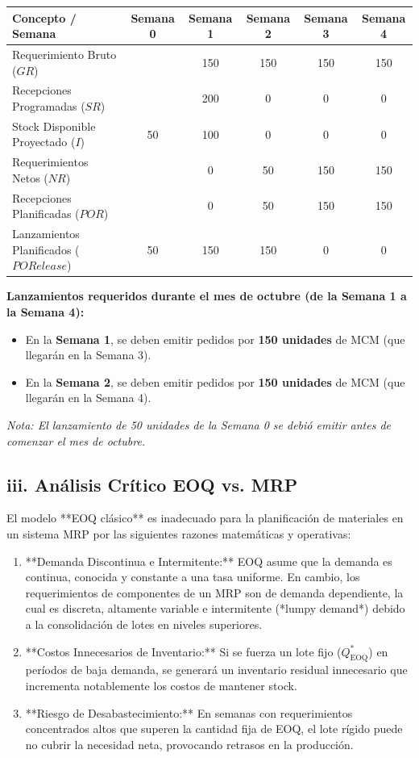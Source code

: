 \documentclass[11pt, a4paper]{article}
\begin{document}
\begin{center}
  \small
  \begin{tabular}{lccccc}
    \toprule
    \textbf{Concepto / Semana} & \textbf{Semana 0} & \textbf{Semana 1} & \textbf{Semana 2} & \textbf{Semana 3} & \textbf{Semana 4} \\
    \midrule
    Requerimiento Bruto ($GR$) & & 150 & 150 & 150 & 150 \\
    Recepciones Programadas ($SR$) & & 200 & 0 & 0 & 0 \\
    Stock Disponible Proyectado ($I$) & 50 & 100 & 0 & 0 & 0 \\
    Requerimientos Netos ($NR$) & & 0 & 50 & 150 & 150 \\
    Recepciones Planificadas ($POR$) & & 0 & 50 & 150 & 150 \\
    Lanzamientos Planificados ($PORelease$) & 50 & 150 & 150 & 0 & 0 \\
    \bottomrule
  \end{tabular}
\end{center}

\textbf{Lanzamientos requeridos durante el mes de octubre (de la Semana 1 a la Semana 4):}
\begin{itemize}
  \item En la \textbf{Semana 1}, se deben emitir pedidos por \textbf{150 unidades} de MCM (que llegarán en la Semana 3).
  \item En la \textbf{Semana 2}, se deben emitir pedidos por \textbf{150 unidades} de MCM (que llegarán en la Semana 4).
\end{itemize}
\textit{Nota: El lanzamiento de 50 unidades de la Semana 0 se debió emitir antes de comenzar el mes de octubre.}

\subsection*{iii. Análisis Crítico EOQ vs. MRP}

El modelo **EOQ clásico** es inadecuado para la planificación de materiales en un sistema MRP por las siguientes razones matemáticas y operativas:
\begin{enumerate}
  \item **Demanda Discontinua e Intermitente:** EOQ asume que la demanda es continua, conocida y constante a una tasa uniforme. En cambio, los requerimientos de componentes de un MRP son de demanda dependiente, la cual es discreta, altamente variable e intermitente (*lumpy demand*) debido a la consolidación de lotes en niveles superiores.
  \item **Costos Innecesarios de Inventario:** Si se fuerza un lote fijo ($Q^*_{\text{EOQ}}$) en períodos de baja demanda, se generará un inventario residual innecesario que incrementa notablemente los costos de mantener stock.
  \item **Riesgo de Desabastecimiento:** En semanas con requerimientos concentrados altos que superen la cantidad fija de EOQ, el lote rígido puede no cubrir la necesidad neta, provocando retrasos en la producción.
\end{enumerate}
\end{document}
